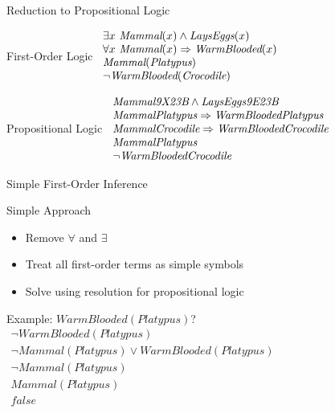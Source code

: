 \documentclass[14pt]{beamer}
\begin{document}
\begin{frame}{Reduction to Propositional Logic}
\begin{block}{First-Order Logic}
$
\begin{array}{l}
\exists x\ \textit{Mammal}(x) \land \textit{LaysEggs}(x) \\
\forall x\ \textit{Mammal}(x) \Rightarrow \textit{WarmBlooded}(x) \\
\textit{Mammal}(\textit{Platypus}) \\
\lnot \textit{WarmBlooded}(\textit{Crocodile})
\end{array}
$
\end{block}
\pause
\begin{block}{Propositional Logic}
$
\begin{array}{l}
\textit{Mammal9X23B} \land \textit{LaysEggs9E23B} \\
\textit{MammalPlatypus} \Rightarrow \textit{WarmBloodedPlatypus} \\
\textit{MammalCrocodile} \Rightarrow \textit{WarmBloodedCrocodile} \\
\textit{MammalPlatypus} \\
\lnot \textit{WarmBloodedCrocodile}
\end{array}
$
\end{block}
\end{frame}

\begin{frame}{Simple First-Order Inference}
	\begin{block}{Simple Approach}
		\begin{itemize}
			\item Remove $\forall$ and $\exists$
			\item Treat all first-order terms as simple symbols
			\item Solve using resolution for propositional logic
		\end{itemize}
	\end{block}
	\pause
	\begin{block}{Example: $\textit{WarmBlooded}(\textit{Platypus})$?}
		$
		\begin{array}{l}
			\lnot\textit{WarmBlooded}(\textit{Platypus}) \\
			\lnot\textit{Mammal}(\textit{Platypus}) \lor \textit{WarmBlooded}(\textit{Platypus}) \\
			\hline
			\lnot\textit{Mammal}(\textit{Platypus}) \\
			\textit{Mammal}(\textit{Platypus}) \\
			\hline
			\textit{false}
		\end{array}
		$
	\end{block}
\end{frame}
\end{document}
